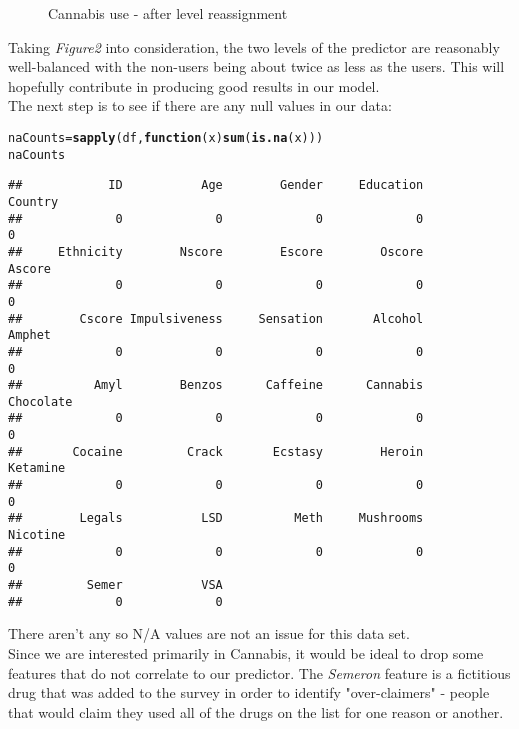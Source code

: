 \documentclass{article}\usepackage[]{graphicx}\usepackage[]{color}
\makeatletter
\newcommand{\hlstd}[1]{\textcolor[rgb]{0.345,0.345,0.345}{#1}}%
\newcommand{\hlkwa}[1]{\textcolor[rgb]{0.161,0.373,0.58}{\textbf{#1}}}%
\newcommand{\hlkwb}[1]{\textcolor[rgb]{0.69,0.353,0.396}{#1}}%
\newcommand{\hlkwc}[1]{\textcolor[rgb]{0.333,0.667,0.333}{#1}}%
\newcommand{\hlkwd}[1]{\textcolor[rgb]{0.737,0.353,0.396}{\textbf{#1}}}%
\newenvironment{kframe}{%
 \def\at@end@of@kframe{}%
 \ifinner\ifhmode%
  \def\at@end@of@kframe{\end{minipage}}%
  \begin{minipage}{\columnwidth}%
 \fi\fi%
 \def\FrameCommand##1{\hskip\@totalleftmargin \hskip-\fboxsep
 \colorbox{shadecolor}{##1}\hskip-\fboxsep
     \hskip-\linewidth \hskip-\@totalleftmargin \hskip\columnwidth}%
 \MakeFramed {\advance\hsize-\width
   \@totalleftmargin\z@ \linewidth\hsize
   \@setminipage}}%
 {\par\unskip\endMakeFramed%
 \at@end@of@kframe}
\newenvironment{knitrout}{}{} %
\makeatother
\begin{document}
\begin{itemize}
\begin{figure}[H]
\begin{center}
\begin{knitrout}
\end{knitrout}
\caption {Cannabis use - after level reassignment}
\label{fig2}
\end {center}
\end {figure}

Taking \textit{Figure2} into consideration, the two levels of the predictor are reasonably well-balanced with the non-users being about twice as less as the users. This will hopefully contribute in producing good results in our model.
\\

The next step is to see if there are any null values in our data:

\begin{knitrout}
\color{fgcolor}\begin{kframe}
\begin{alltt}
\hlstd{naCounts} \hlkwb{=} \hlkwd{sapply}\hlstd{(df,}\hlkwa{function}\hlstd{(}\hlkwc{x}\hlstd{)} \hlkwd{sum}\hlstd{(}\hlkwd{is.na}\hlstd{(x)))}
\hlstd{naCounts}
\end{alltt}
\begin{verbatim}
##            ID           Age        Gender     Education       Country 
##             0             0             0             0             0 
##     Ethnicity        Nscore        Escore        Oscore        Ascore 
##             0             0             0             0             0 
##        Cscore Impulsiveness     Sensation       Alcohol        Amphet 
##             0             0             0             0             0 
##          Amyl        Benzos      Caffeine      Cannabis     Chocolate 
##             0             0             0             0             0 
##       Cocaine         Crack       Ecstasy        Heroin      Ketamine 
##             0             0             0             0             0 
##        Legals           LSD          Meth     Mushrooms      Nicotine 
##             0             0             0             0             0 
##         Semer           VSA 
##             0             0
\end{verbatim}
\end{kframe}
\end{knitrout}

There aren't any so N/A values are not an issue for this data set.
\\

Since we are interested primarily in Cannabis, it would be ideal to drop some features that do not correlate to our predictor. 
The \textit{Semeron} feature is a fictitious drug that was added to the survey in order to identify "over-claimers" - people that would claim they used all of the drugs on the list for one reason or another.


\end{itemize}
\end{document}
